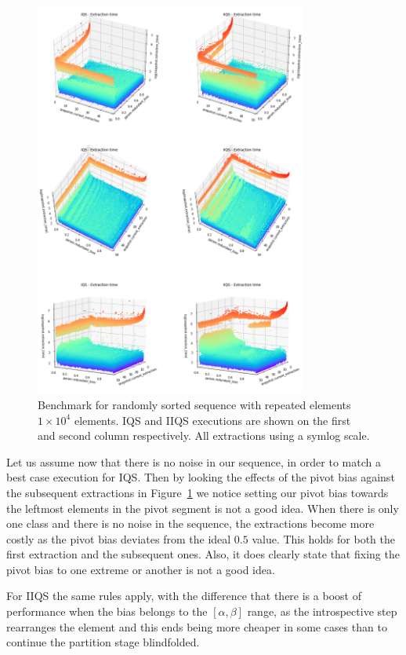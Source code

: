 \begin{figure}[!ht]
    \centering
    \includegraphics[width=0.8\textwidth]{./fragments/04_experimental_execution/images/01_basebenchmark_07_extraction_bias.png}
    \caption{Benchmark for randomly sorted sequence with repeated elements $1\times10^4$ elements. IQS and IIQS executions are shown on the first and second column respectively. All extractions using a symlog scale.}
    \label{FIG:BENCHMARK_07_NOISE_BIAS}
\end{figure}

Let us assume now that there is no noise in our sequence, in order to match a best case execution for IQS. Then by looking the effects of the pivot bias against the subsequent extractions in Figure~\ref{FIG:BENCHMARK_07_NOISE_BIAS} we notice setting our pivot bias towards the leftmost elements in the pivot segment is not a good idea. When there is only one class and there is no noise in the sequence, the extractions become more costly as the pivot bias deviates from the ideal $0.5$ value. This holds for both the first extraction and the subsequent ones. Also, it does clearly state that fixing the pivot bias to one extreme or another is not a good idea. 

For IIQS the same rules apply, with the difference that there is a boost of performance when the bias belongs to the $[\alpha,\beta]$ range, as the introspective step rearranges the element and this ends being more cheaper in some cases than to continue the partition stage blindfolded.

\FloatBarrier